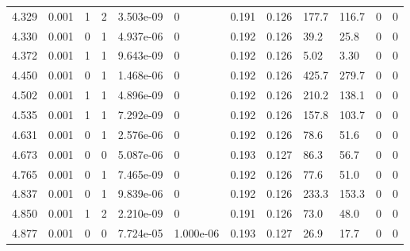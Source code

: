 \documentclass[preview]{standalone}
\begin{document}
{{{\begin{tabular}{L{1.2cm}C{1.2cm} C{0.3cm}C{0.5cm} C{1.4cm}C{1.4cm} C{1.4cm}C{1.4cm} C{1.6cm}C{1.6cm} C{1.6cm}C{1.6cm}}
  4.329  &  0.001  & 1     &  2 &  3.503e-09  & 0  &  0.191&   0.126& 177.7 & 116.7   &  0 & 0  \\ 
  4.330  &  0.001  & 0     &  1 &  4.937e-06  & 0  &  0.192&   0.126& 39.2 & 25.8   &  0 & 0  \\ 
  4.372  &  0.001  & 1     &  1 &  9.643e-09  & 0  &  0.192&   0.126& 5.02 & 3.30   &  0 & 0  \\ 
  4.450  &  0.001  & 0     &  1 &  1.468e-06  & 0  &  0.192&   0.126& 425.7 & 279.7   &  0 & 0  \\ 
  4.502  &  0.001  & 1     &  1 &  4.896e-09  & 0  &  0.192&   0.126& 210.2 & 138.1   &  0 & 0  \\ 
  4.535  &  0.001  & 1     &  1 &  7.292e-09  & 0  &  0.192&   0.126& 157.8 & 103.7   &  0 & 0  \\ 
  4.631  &  0.001  & 0     &  1 &  2.576e-06  & 0  &  0.192&   0.126& 78.6 & 51.6   &  0 & 0  \\ 
  4.673  &  0.001  & 0     &  0 &  5.087e-06  & 0  &  0.193&   0.127& 86.3 & 56.7   &  0 & 0  \\ 
  4.765  &  0.001  & 0     &  1 &  7.465e-09  & 0  &  0.192&   0.126& 77.6 & 51.0   &  0 & 0  \\ 
  4.837  &  0.001  & 0     &  1 &  9.839e-06  & 0  &  0.192&   0.126& 233.3 & 153.3   &  0 & 0  \\ 
  4.850  &  0.001  & 1     &  2 &  2.210e-09  & 0  &  0.191&   0.126& 73.0 & 48.0   &  0 & 0  \\ 
  4.877  &  0.001  & 0     &  0 &  7.724e-05  & 1.000e-06  &  0.193&   0.127& 26.9 & 17.7   &  0 & 0  \\ 
\hline 
\end{tabular} 

}}}
\end{document}
